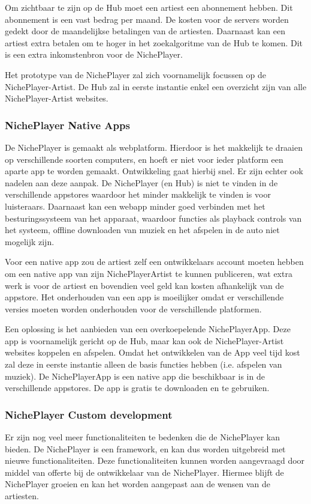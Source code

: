 Om zichtbaar te zijn op de Hub moet een artiest een abonnement hebben. Dit abonnement is een vast bedrag per maand. De kosten voor de servers worden gedekt door de maandelijkse betalingen van de artiesten. Daarnaast kan een artiest extra betalen om te hoger in het zoekalgoritme van de Hub te komen. Dit is een extra inkomstenbron voor de NichePlayer.

Het prototype van de NichePlayer zal zich voornamelijk focussen op de NichePlayer-Artist. De Hub zal in eerste instantie enkel een overzicht zijn van alle NichePlayer-Artist websites.

\subsubsection*{NichePlayer Native Apps}
De NichePlayer is gemaakt als webplatform. Hierdoor is het makkelijk te draaien op verschillende soorten computers, en hoeft er niet voor ieder platform een aparte app te worden gemaakt. Ontwikkeling gaat hierbij snel. Er zijn echter ook nadelen aan deze aanpak. De NichePlayer (en Hub) is niet te vinden in de verschillende appstores waardoor het minder makkelijk te vinden is voor luisteraars. Daarnaast kan een webapp minder goed verbinden met het besturingssysteem van het apparaat, waardoor functies als playback controls van het systeem, offline downloaden van muziek en het afspelen in de auto niet mogelijk zijn.

Voor een native app zou de artiest zelf een ontwikkelaars account moeten hebben om een native app van zijn NichePlayerArtist te kunnen publiceren, wat extra werk is voor de artiest en bovendien veel geld kan kosten afhankelijk van de appstore. Het onderhouden van een app is moeilijker omdat er verschillende versies moeten worden onderhouden voor de verschillende platformen.

Een oplossing is het aanbieden van een overkoepelende NichePlayerApp. Deze app is voornamelijk gericht op de Hub, maar kan ook de NichePlayer-Artist websites koppelen en afspelen. Omdat het ontwikkelen van de App veel tijd kost zal deze in eerste instantie alleen de basis functies hebben (i.e. afspelen van muziek). De NichePlayerApp is een native app die beschikbaar is in de verschillende appstores. De app is gratis te downloaden en te gebruiken.

\subsubsection*{NichePlayer Custom development}
Er zijn nog veel meer functionaliteiten te bedenken die de NichePlayer kan bieden. De NichePlayer is een framework, en kan dus worden uitgebreid met nieuwe functionaliteiten. Deze functionaliteiten kunnen worden aangevraagd door middel van offerte bij de ontwikkelaar van de NichePlayer. Hiermee blijft de NichePlayer groeien en kan het worden aangepast aan de wensen van de artiesten.

